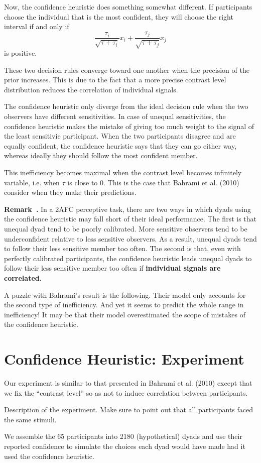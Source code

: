 \documentclass[12pt]{report}
\newcounter{example}[section]
\newenvironment{remark}[1][]{\refstepcounter{example}\par\medskip
   \noindent \textbf{Remark~\theexample. #1} \rmfamily}{\medskip}
\begin{document}
Now, the confidence heuristic does something somewhat different. If participants choose the individual that is the most confident, they will choose the right interval if and only if $$ \frac{\tau_i}{\sqrt{\tau+\tau_i}} x_i + \frac{\tau_j}{\sqrt{\tau+\tau_j}} x_j $$ is positive. 

These two decision rules converge toward one another when the precision of the prior increases. This is due to the fact that a more precise contrast level distribution reduces the correlation of individual signals. 

The confidence heuristic only diverge from the ideal decision rule when the two observers have different sensitivities. In case of unequal sensitivities, the confidence heuristic makes the mistake of giving too much weight to the signal of the least sensitivie participant. When the two participants disagree and are equally confident, the confidence heuristic says that they can go either way, whereas ideally they should follow the most confident member. 

This inefficiency becomes maximal when the contrast level becomes infinitely variable, i.e. when $\tau$ is close to 0. This is the case that Bahrami et al. (2010) consider when they make their predictions. 

\begin{remark}
In a 2AFC perceptive task, there are two ways in which dyads using the confidence heuristic may fall short of their ideal performance. The first is that unequal dyad tend to be poorly calibrated. More sensitive observers tend to be underconfident relative to less sensitive observers. As a result, unequal dyads tend to follow their less sensitive member too often. The second is that, even with perfectly calibrated participants, the confidence heuristic leads unequal dyads to follow their less sensitive member too often if \textbf{individual signals are correlated.}

A puzzle with Bahrami's result is the following. Their model only accounts for the second type of inefficiency. And yet it seems to predict the whole range in inefficiency! It may be that their model overestimated the scope of mistakes of the confidence heuristic.
\end{remark}

\chapter{Confidence Heuristic: Experiment} 
Our experiment is similar to that presented in Bahrami et al. (2010) except that we fix the ``contrast level'' so as not to induce correlation between participants. 

Description of the experiment. Make sure to point out that all participants faced the same stimuli.

We assemble the 65 participants into 2180 (hypothetical) dyads and use their reported confidence to simulate the choices each dyad would have made had it used the confidence heuristic. 
\end{document}
